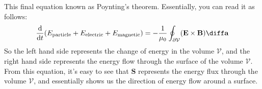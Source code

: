 This final equation known as Poynting's theorem. Essentially, you can read it as follows:
\[
	\dv{t}(E_\text{particle} + E_\text{electric} + E_\text{magnetic}) = -\frac{1}{\mu_0} \oint_{\partial
	\mathcal{V}} (\mathbf{E} \times \mathbf{B}) \diff \mathbf{a}
\]
So the left hand side represents the change of energy in the volume \( \mathcal{V} \), and the right hand
side represents the energy flow through the surface of the volume \( \mathcal{V} \). From this equation, it's
easy to see that \( \mathbf{S} \) represents the energy flux through the volume \( \mathcal{V} \), and
essentially shows us the direction of energy flow around a surface. 
   






